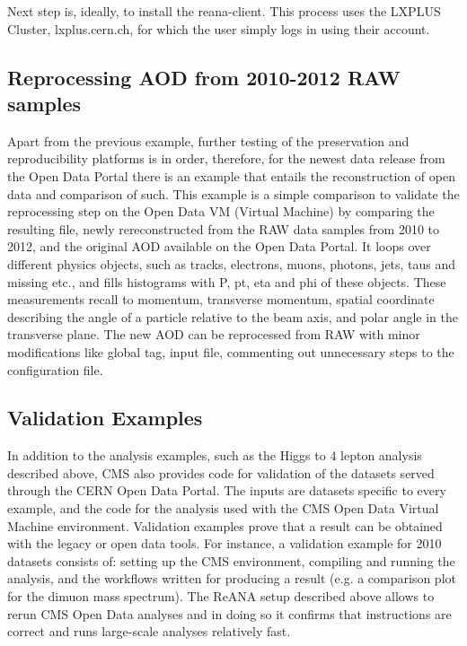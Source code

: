 \documentclass[letter]{article}
\newcommand\tab[1][1cm]{\hspace*{#1}}
\begin{document}
Next step is, ideally, to install the reana-client. This process uses the LXPLUS Cluster, lxplus.cern.ch, for which the user simply logs in using their account. 


\subsection{Reprocessing AOD from 2010-2012 RAW samples}
\tab Apart from the previous example, further testing of the preservation and reproducibility platforms is in order, therefore, for the newest data release from the Open Data Portal there is an example that entails the reconstruction of open data and comparison of such. 
This example is a simple comparison to validate the reprocessing step on the Open Data VM (Virtual Machine) by comparing the resulting file, newly rereconstructed from the RAW data samples from 2010 to 2012, and the original AOD available on the Open Data Portal. It loops over different physics objects, such as tracks, electrons, muons, photons, jets, taus and missing etc., and fills histograms with P, pt, eta and phi of these objects. These measurements recall to momentum, transverse momentum, spatial coordinate describing the angle of a particle relative to the beam axis, and polar angle in the transverse plane. The new AOD can be reprocessed from RAW with minor modifications like global tag, input file, commenting out unnecessary steps to the configuration file. 

\subsection{Validation Examples}
\tab In addition to the analysis examples, such as the Higgs to 4 lepton analysis described above, CMS also provides code for validation of the datasets served through the CERN Open Data Portal. The inputs are datasets specific to every example, and the code for the analysis used with the CMS Open Data Virtual Machine environment.  Validation examples prove that a result can be obtained with the legacy or open data tools. For instance, a validation example for 2010 datasets consists of: setting up the CMS environment, compiling and running the analysis, and the workflows written for producing a result (e.g. a comparison plot for the dimuon mass spectrum). The ReANA setup described above allows to rerun CMS Open Data
analyses and in doing so it confirms that instructions are correct and runs large-scale analyses relatively fast.
\end{document}
